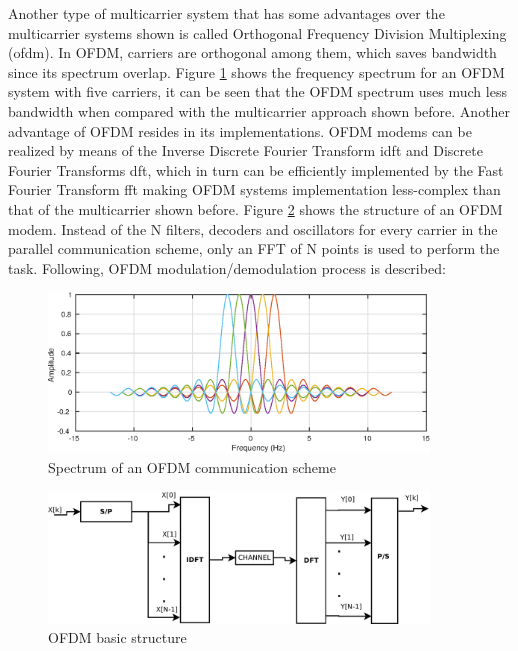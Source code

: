 Another type of multicarrier system that has some advantages over the multicarrier systems shown is called  Orthogonal Frequency Division Multiplexing (\ac{ofdm}). In OFDM, carriers are orthogonal among them, which saves bandwidth since its spectrum overlap.  Figure \ref{fig:multicarrier_ofdm_spectrum} shows the frequency spectrum for an OFDM system with five carriers, it can be seen that the OFDM spectrum uses much less bandwidth when compared with the multicarrier approach shown before. Another advantage of OFDM resides in its implementations. OFDM modems can be realized by means of the Inverse Discrete Fourier Transform \ac{idft} and Discrete Fourier Transforms \ac{dft}, which in turn can be efficiently implemented by the Fast Fourier Transform \ac{fft} making OFDM systems implementation less-complex than that of the multicarrier shown before. Figure \ref{fig:multicarrier_ofdm_diagram} shows the structure of an OFDM modem. Instead of the N filters, decoders and oscillators for every carrier in the parallel communication scheme, only an FFT of N points is used to perform the task. Following, OFDM modulation/demodulation process is described:


\begin{figure}[hbt]
  \centering
    \includegraphics[width=0.9\textwidth]
      {./figures/spectrum_example_ofdm}
  \caption{Spectrum of an OFDM communication scheme}
  \label{fig:multicarrier_ofdm_spectrum}
\end{figure}

 
\begin{figure}[hbt]
  \centering
    \includegraphics[width=0.9\textwidth]
      {./figures/multicarrier_diagram_ofdm}
  \caption{OFDM basic structure}
  \label{fig:multicarrier_ofdm_diagram}
\end{figure}


